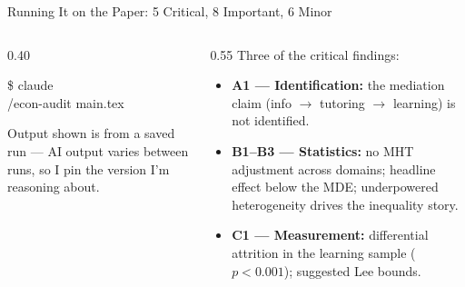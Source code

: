 \documentclass[aspectratio=169, 10pt]{beamer}
\begin{document}
\begin{frame}[fragile]{Running It on the Paper: 5 Critical, 8 Important, 6 Minor}
\vskip-2pt
\begin{columns}[T]
\begin{column}{0.40\textwidth}
\begin{tcolorbox}[colback=DarkSlate, colframe=CoolGray!40, boxrule=0.5pt, arc=3pt,
  left=6pt, right=6pt, top=5pt, bottom=5pt]
{\color{CoolGray}\ttfamily\small\$\; claude}\\[3pt]
{\color{white}\ttfamily\small /econ-audit main.tex}
\end{tcolorbox}
\vskip4pt
{\scriptsize\color{CoolGray} Output shown is from a saved run --- AI output varies between runs, so I pin the version I'm reasoning about.}
\end{column}
\begin{column}{0.55\textwidth}
\small Three of the critical findings:
\vskip3pt
\begin{tcolorbox}[coralbox, title={\faExclamationTriangle\quad Critical}, top=3pt, bottom=3pt]
\footnotesize
\begin{itemize}\setlength{\itemsep}{2pt}
  \item \textbf{A1 --- Identification:} the mediation claim (info $\rightarrow$ tutoring $\rightarrow$ learning) is not identified.
  \item \textbf{B1--B3 --- Statistics:} no MHT adjustment across domains; headline effect below the MDE; underpowered heterogeneity drives the inequality story.
  \item \textbf{C1 --- Measurement:} differential attrition in the learning sample ($p<0.001$); suggested Lee bounds.
\end{itemize}
\end{tcolorbox}
\end{column}
\end{columns}
\end{frame}
\end{document}
